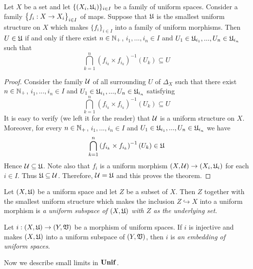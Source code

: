 \begin{theorem}\label{theorem:description_of_uniform_structure_introduced_by_a_family_of_maps}
Let $X$ be a set and let $\{(X_i,{\mathfrak U}_i)\}_{i\in I}$ be a family of uniform spaces. Consider a family $\big\{f_i:X\rightarrow X_i\big\}_{i\in I}$ of maps. Suppose that ${\mathfrak U}$ is the smallest uniform structure on $X$ which makes $\{f_i\}_{i\in I}$ into a family of uniform morphisms. Then $U \in {\mathfrak U}$ if and only if there exist $n\in {\mathbb N}_+$, $i_1,...,i_n\in I$ and $U_1 \in {\mathfrak U}_{i_1},...,U_n\in {\mathfrak U}_{i_n}$ such that
$$\bigcap_{k=1}^n\left(f_{i_k}\times f_{i_k}\right)^{-1}(U_k) \subseteq U$$
\end{theorem}
\begin{proof}
Consider the family ${\mathcal U}$ of all surrounding $U$ of $\Delta_X$ such that there exist $n\in {\mathbb N}_+$, $i_1,...,i_n\in I$ and $U_1 \in {\mathfrak U}_{i_1},...,U_n\in {\mathfrak U}_{i_n}$ satisfying
$$\bigcap_{k=1}^n\left(f_{i_k}\times f_{i_k}\right)^{-1}(U_k) \subseteq U$$
It is easy to verify (we left it for the reader) that ${\mathcal U}$ is a uniform structure on $X$. Moreover, for every $n\in {\mathbb N}_+$, $i_1,...,i_n\in I$ and $U_1 \in {\mathfrak U}_{i_1},...,U_n\in {\mathfrak U}_{i_n}$ we have
$$\bigcap_{k=1}^n\left(f_{i_k}\times f_{i_k}\right)^{-1}(U_k) \in {\mathfrak U}$$
Hence ${\mathcal U} \subseteq {\mathfrak U}$. Note also that $f_i$ is a uniform morphism $(X,{\mathcal U})\rightarrow (X_i,{\mathfrak U}_i)$ for each $i\in I$. Thus ${\mathfrak U} \subseteq {\mathcal U}$. Therefore, ${\mathcal U} = {\mathfrak U}$ and this proves the theorem. 
\end{proof}

\begin{definition}
Let $(X,{\mathfrak U})$ be a uniform space and let $Z$ be a subset of $X$. Then $Z$ together with the smallest uniform structure which makes the inclusion $Z\hookrightarrow X$ into a uniform morphism is \textit{a uniform subspace of $(X,{\mathfrak U})$ with $Z$ as the underlying set}.
\end{definition}

\begin{definition}
Let $i:\left(X,{\mathfrak U}\right)\rightarrow \left(Y,{\mathfrak V}\right)$ be a morphism of uniform spaces. If $i$ is injective and makes $\left(X,{\mathfrak U}\right)$ into a uniform subspace of $\left(Y,{\mathfrak V}\right)$, then $i$ is \textit{an embedding of uniform spaces}.
\end{definition}
\noindent
Now we describe small limits in $\mathbf{Unif}$.

